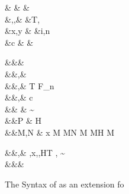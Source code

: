 \documentclass[manuscript,screen,nonacm]{acmart}
\begin{document}
\begin{figure}[h]
  \centering
  \begin{syntax}
     &\shl{\chi}   &                            & \\
     &\TyVar,\beta,\Co  &\qquad{} &T, \\
     &x,y                  &\qquad{}        &i,n \in {} \\
     &c & &
  \end{syntax}
  \begin{syntax}
          &&\square & \\
         &&\kappa,\eta       \bnfeq& \shl{\chi} \bnfor \STAR \bnfor {} \bnfor \kappa \to \kappa \bnfor {}\\
         &&\tau,\sigma  \bnfeq& \TyVar \bnfor T \bnfor \tau \to \tau \bnfor \tau\App\tau \bnfor \Forall {\TyVar\co\kappa} \tau \bnfor F_n \bnfor \shl{\Forall \chi \tau} \bnfor \shl{\tau\App\kappa} \bnfor {}\\
     &&\nu,\Co      \bnfeq& c \bnfor {}\tau \bnfor \Sym\Co \bnfor \trans\nu\Co %
                                      \bnfor \Forall {\TyVar\co\kappa} \Co \bnfor \Co\At\tau %
                                      \bnfor \nu\App\Co \bnfor \Left \Co \bnfor \Right \Co  %
                                      \bnfor \shl{\Forall \chi \Co} \bnfor \shl{\Co\App\chi} %
                                      \bnfor \shl{\Co\At\chi}\\
     && \phi \bnfeq& \sigma \sim \tau\\
      &&P    \bnfeq& H\App\shl{\many\chi}\App\many{\TyVar\co\kappa} \\
         &&M,N  \bnfeq& x \bnfor  {} M \bnfor M\App N \bnfor \TLam{\tau\co\kappa} M \bnfor M\App \tau \bnfor H \bnfor \Case M  \bnfor \Cast \Tm \Co %
                             \bnfor \shl{\TLam \chi \Tm} \bnfor \shl{\Tm\App\kappa} \\

    \end{syntax}
    \begin{syntax}
     &&\TEnv,\Delta \bnfeq& \empt \bnfor \TEnv,x\co\tau \bnfor \TEnv,\TyVar\co\kappa \bnfor \TEnv,H\co T \bnfor \TEnv, \Co \co \tau\sim\sigma\\
      &&\Subst       \bnfeq& \empt \bnfor \Set{\many{\TyVar \mapsto \tau}}
  \end{syntax}
  \caption{The Syntax of \SFP as an extension fo \SFR}
  \label{fig:sfp-syntax}
\end{figure}
\end{document}
